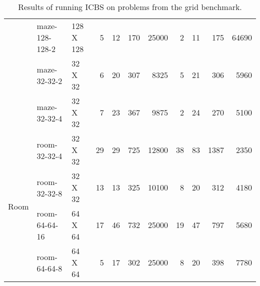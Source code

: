 \begin{table*}[]
\begin{tabular}{@{}lll|rrrr|rrrr@{}}
                                & maze-128-128-2        & 128 X 128  & 5                       & 12                      & 170                        & 25000                   & 2                       & 11                      & 175                        & 64690                   \\
                                & maze-32-32-2          & 32 X 32    & 6                       & 20                      & 307                        & 8325                    & 5                       & 21                      & 306                        & 5960                    \\
                                & maze-32-32-4          & 32 X 32    & 7                       & 23                      & 367                        & 9875                    & 2                       & 24                      & 270                        & 5100                    \\
\midrule \multirow{4}{*}{Room}           & room-32-32-4          & 32 X 32    & 29                      & 29                      & 725                        & 12800                   & 38                      & 83                      & 1387                       & 2350                    \\
                                & room-32-32-8          & 32 X 32    & 13                      & 13                      & 325                        & 10100                   & 8                       & 20                      & 312                        & 4180                    \\
                                & room-64-64-16         & 64 X 64    & 17                      & 46                      & 732                        & 25000                   & 19                      & 47                      & 797                        & 5680                    \\
                                & room-64-64-8          & 64 X 64    & 5                       & 17                      & 302                        & 25000                   & 8                       & 20                      & 398                        & 7780                    \\ \bottomrule
\end{tabular}
\caption{Results of running ICBS on problems from the grid \mapf benchmark.} 
\label{tab:results}
\end{table*}